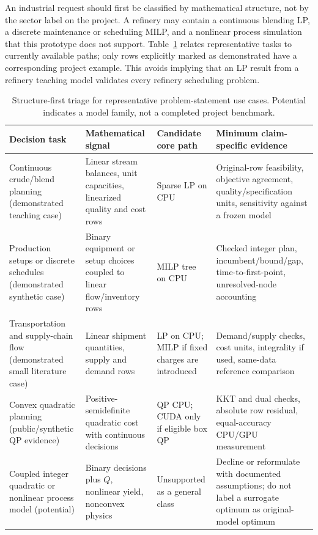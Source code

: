 \documentclass[10pt,a4paper,twocolumn]{article}
\begin{document}
An industrial request should first be classified by mathematical structure, not by the sector label on the project. A refinery may contain a continuous blending LP, a discrete maintenance or scheduling MILP, and a nonlinear process simulation that this prototype does not support. Table~\ref{tab:triage} relates representative tasks to currently available paths; only rows explicitly marked as demonstrated have a corresponding project example. This avoids implying that an LP result from a refinery teaching model validates every refinery scheduling problem.

\begin{table}[t]
\centering\small
\caption{Structure-first triage for representative problem-statement use cases. Potential indicates a model family, not a completed project benchmark.}
\label{tab:triage}
\begin{tabularx}{\textwidth}{@{}p{}p{}p{}X@{}}
\toprule
Decision task & Mathematical signal & Candidate core path & Minimum claim-specific evidence\\
\midrule
Continuous crude/blend planning (demonstrated teaching case) & Linear stream balances, unit capacities, linearized quality and cost rows & Sparse LP on CPU & Original-row feasibility, objective agreement, quality/specification units, sensitivity against a frozen model\\
Production setups or discrete schedules (demonstrated synthetic case) & Binary equipment or setup choices coupled to linear flow/inventory rows & MILP tree on CPU & Checked integer plan, incumbent/bound/gap, time-to-first-point, unresolved-node accounting\\
Transportation and supply-chain flow (demonstrated small literature case) & Linear shipment quantities, supply and demand rows & LP on CPU; MILP if fixed charges are introduced & Demand/supply checks, cost units, integrality if used, same-data reference comparison\\
Convex quadratic planning (public/synthetic QP evidence) & Positive-semidefinite quadratic cost with continuous decisions & QP CPU; CUDA only if eligible box QP & KKT and dual checks, absolute row residual, equal-accuracy CPU/GPU measurement\\
Coupled integer quadratic or nonlinear process model (potential) & Binary decisions plus $Q$, nonlinear yield, nonconvex physics & Unsupported as a general class & Decline or reformulate with documented assumptions; do not label a surrogate optimum as original-model optimum\\
\bottomrule
\end{tabularx}
\end{table}
\end{document}
